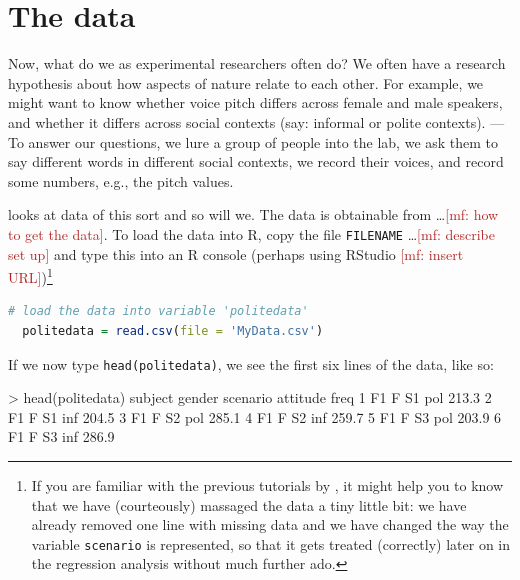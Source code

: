 \documentclass[nobib]{tufte-handout}
\renewcommand{\mf}[1]{\textcolor{firebrick}{[mf: #1]}}
\newcommand{\ri}[1]{\lstinline{#1}}  %
\begin{document}
\section{The data}
\label{sec:data}

Now, what do we as experimental researchers often do? We often have a research hypothesis about how aspects of nature relate to each other. For example, we might want to know whether voice pitch differs across female and male speakers, and whether it differs across social contexts (say: informal or polite contexts). --- To answer our questions, we lure a group of people into the lab, we ask them to say different words in different social contexts, we record their voices, and record some numbers, e.g., the pitch values.

\citet{Winter2013:Linear-models-a} looks at data of this sort \citep[taken from][]{WinterGrawunder2012:The-Phonetic-Pr} and so will we. The data is obtainable from \dots \mf{how to get the data}. To load the data into R, copy the file \texttt{FILENAME} \dots \mf{describe set up} and type this into an R console (perhaps using
RStudio \mf{insert URL})\footnote{If you are familiar with the previous tutorials by \citet{Winter2013:Linear-models-a}, it might help you to know that we have (courteously) massaged the data a tiny little bit: we have already removed one line with missing data and we have changed the way the variable
\texttt{scenario} is represented, so that it gets treated (correctly) later on in the regression analysis without much further ado.}

\medskip

\begin{lstlisting}[language=R]
  # load the data into variable 'politedata'
  politedata = read.csv(file = 'MyData.csv')     
\end{lstlisting}

\vspace*{-0.5cm}

\noindent If we now type \ri{head(politedata)}, we see the first six lines of the data, like so:

\medskip


\begin{rc}
> head(politedata)
  subject gender scenario attitude  freq
1      F1      F       S1      pol 213.3
2      F1      F       S1      inf 204.5
3      F1      F       S2      pol 285.1
4      F1      F       S2      inf 259.7
5      F1      F       S3      pol 203.9
6      F1      F       S3      inf 286.9
\end{rc}
\end{document}
